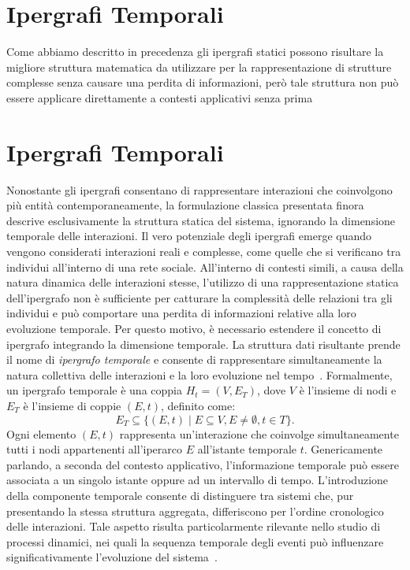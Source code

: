 \section{Ipergrafi Temporali}\label{sec:ipergrafi_temporali}

Come abbiamo descritto in precedenza gli ipergrafi statici possono risultare la migliore struttura matematica da utilizzare per la rappresentazione di strutture complesse senza causare una perdita di informazioni, però tale struttura non può essere applicare direttamente a contesti applicativi senza prima 



\section{Ipergrafi Temporali}\label{sec:ipergrafi_temporali}

Nonostante gli ipergrafi consentano di rappresentare interazioni che coinvolgono più entità contemporaneamente, la formulazione classica presentata finora descrive esclusivamente la struttura statica del sistema, ignorando la dimensione temporale delle interazioni.
Il vero potenziale degli ipergrafi emerge quando vengono considerati interazioni reali e complesse, come quelle che si verificano tra individui all'interno di una rete sociale.
All'interno di contesti simili, a causa della natura dinamica delle interazioni stesse, l'utilizzo di una rappresentazione statica dell'ipergrafo non è sufficiente per catturare la complessità delle relazioni tra gli individui e può comportare una perdita di informazioni relative alla loro evoluzione temporale.
Per questo motivo, è necessario estendere il concetto di ipergrafo integrando la dimensione temporale.
La struttura dati risultante prende il nome di \textit{ipergrafo temporale} e consente di rappresentare simultaneamente la natura collettiva delle interazioni e la loro evoluzione nel tempo~\cite{cencetti2021}.
Formalmente, un ipergrafo temporale è una coppia $H_t = (V, E_T)$, dove $V$ è l'insieme di nodi e $E_T$ è l'insieme di coppie $(E, t)$, definito come:
\[
    E_T \subseteq \{(E,t) \mid E \subseteq V, E \neq \emptyset, t \in T\}.
\]
Ogni elemento $(E,t)$ rappresenta un'interazione che coinvolge simultaneamente tutti i nodi appartenenti all'iperarco $E$ all'istante temporale $t$.
Genericamente parlando, a seconda del contesto applicativo, l'informazione temporale può essere associata a un singolo istante oppure ad un intervallo di tempo.
L'introduzione della componente temporale consente di distinguere tra sistemi che, pur presentando la stessa struttura aggregata, differiscono per l'ordine cronologico delle interazioni.
Tale aspetto risulta particolarmente rilevante nello studio di processi dinamici, nei quali la sequenza temporale degli eventi può influenzare significativamente l'evoluzione del sistema~\cite{holme2012}.

